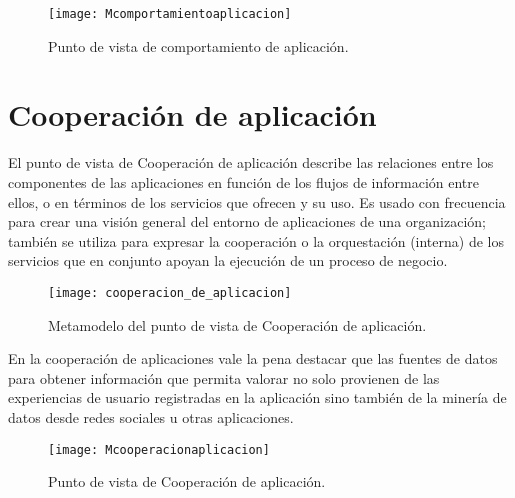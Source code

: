 \begin{figure}[H]
\centering
\texttt{[image: Mcomportamientoaplicacion]}
\caption{Punto de vista de comportamiento de aplicación.}
\end{figure}

\section{Cooperación de aplicación}
El punto de vista de Cooperación de aplicación describe las relaciones entre los componentes de las aplicaciones en función de los flujos de información entre ellos, o en términos de los servicios que ofrecen y su uso. Es usado con frecuencia para crear una visión general del entorno de aplicaciones de una organización; también se utiliza para expresar la cooperación o la orquestación (interna) de los servicios que en conjunto apoyan la ejecución de un proceso de negocio.

\begin{figure}[H]
\centering
\texttt{[image: cooperacion\_de\_aplicacion]}
\caption{Metamodelo del punto de vista de Cooperación de aplicación.}
\end{figure}



En la cooperación de aplicaciones vale la pena destacar que las fuentes de datos para obtener información que permita valorar no solo provienen de las experiencias de usuario registradas en la aplicación sino también de la minería de datos desde redes sociales u otras aplicaciones.

\begin{figure}[H]
\centering
\texttt{[image: Mcooperacionaplicacion]}
\caption{Punto de vista de Cooperación de aplicación.}
\end{figure}


